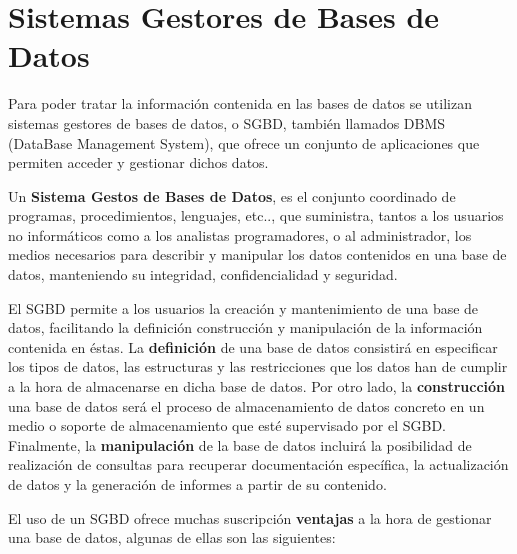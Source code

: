 \section{Sistemas Gestores de Bases de Datos}
Para poder tratar la información contenida en las bases de datos se utilizan sistemas gestores de bases de datos, o SGBD, también llamados DBMS (DataBase Management System), que ofrece un conjunto de aplicaciones que permiten acceder y gestionar dichos datos.

Un \textbf{Sistema Gestos de Bases de Datos}, es el conjunto coordinado de programas, procedimientos, lenguajes, etc.., que suministra, tantos a los usuarios no informáticos como a los analistas programadores, o al administrador,  los medios necesarios para describir y manipular los datos contenidos en una base de datos, manteniendo su integridad, confidencialidad y seguridad.

El SGBD permite a los usuarios la creación y mantenimiento de una base de datos, facilitando la definición construcción y manipulación de la información contenida en éstas. La \textbf{definición} de una base de datos consistirá en especificar los tipos de datos, las estructuras y las restricciones que los datos han de cumplir a la hora de almacenarse en dicha base de datos. Por otro lado, la \textbf{construcción} una base de datos será el proceso de almacenamiento de datos concreto en un medio o soporte de almacenamiento que esté supervisado por el SGBD. Finalmente, la \textbf{manipulación} de la base de datos incluirá la posibilidad de realización de consultas para recuperar documentación específica, la actualización de datos y la generación de informes a partir de su contenido.

El uso de un SGBD ofrece muchas suscripción \textbf{ventajas} a la hora de gestionar una base de datos, algunas de ellas son las siguientes:

